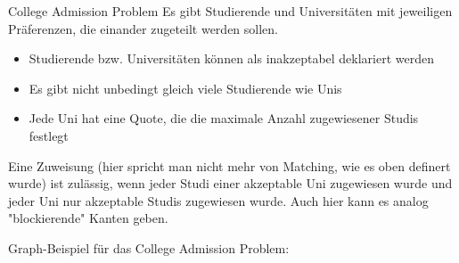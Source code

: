 \documentclass{panikzettel}
\begin{document}
\begin{halfboxl}
	\vspace{-\baselineskip}
	\begin{defi}{College Admission Problem}
		Es gibt Studierende und Universitäten mit jeweiligen Präferenzen, die einander zugeteilt werden sollen.\\
		
		\begin{itemize}
			\item Studierende bzw. Universitäten können als inakzeptabel deklariert werden
			\item Es gibt nicht unbedingt gleich viele Studierende wie Unis
			\item Jede Uni hat eine Quote, die die maximale Anzahl zugewiesener Studis festlegt
		\end{itemize}
	
	Eine Zuweisung (hier spricht man nicht mehr von Matching, wie es oben definert wurde) ist zulässig, wenn jeder Studi einer akzeptable Uni zugewiesen wurde und jeder Uni nur akzeptable Studis zugewiesen wurde. Auch hier kann es analog "blockierende" Kanten geben.
	\end{defi}
\end{halfboxl}%
\begin{halfboxr}
	\vspace{-\baselineskip}
	Graph-Beispiel für das College Admission Problem:\\
	
	\begin{center}
	\end{center}
\end{halfboxr}
\end{document}

